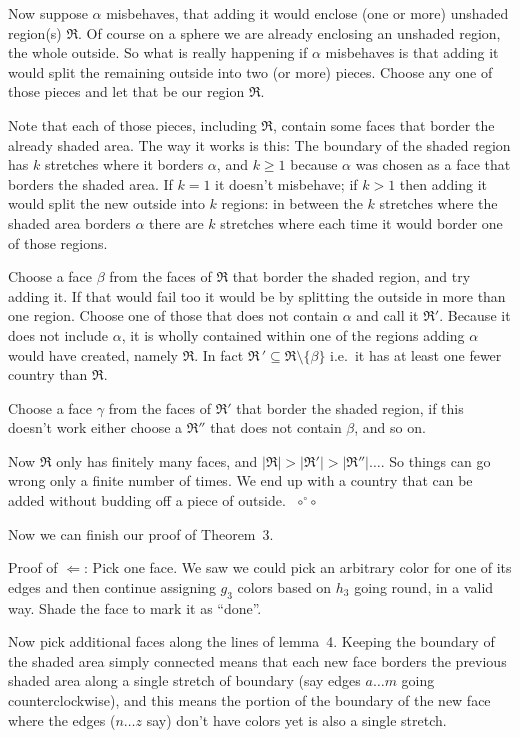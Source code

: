 \documentclass[12pt]{article}
\let\ge\geqslant
\let\S\scriptstyle
\let\os\Longleftarrow
\def\qed{ ${\S\circ}\!{}^\circ\!{\S\circ}$}
\let\frakR\Re
\begin{document}
Now suppose $\alpha$ misbehaves, that adding it would enclose (one or more)
unshaded region(s) $\frakR$. Of course on a sphere we are already
enclosing an unshaded region, the whole outside. So what is really happening
if $\alpha$ misbehaves is that adding it would split the remaining outside
into two (or more) pieces. Choose any one of those pieces and let that be
our region $\frakR$.

Note that each of those pieces, including $\frakR$, contain some faces that
border the already shaded area. The way it works is this: The boundary of the
shaded region has $k$ stretches where it borders $\alpha$, and $k\ge1$ because
$\alpha$ was chosen as a face that borders the shaded area. If $k=1$ it doesn't
misbehave; if $k\gt1$ then adding it would split the new outside into $k$
regions: in between the $k$ stretches where the shaded area borders $\alpha$
there are $k$ stretches where each time it would border one of those regions.

Choose a face $\beta$ from the faces of $\frakR$ that border the shaded
region, and try adding it. If that would fail too it would be by splitting
the outside in more than one region. Choose one of those that does not contain
$\alpha$ and call it $\frakR'$. Because it does not include $\alpha$, it is
wholly contained within one of the regions adding $\alpha$ would have created,
namely $\frakR$. In fact $\frakR\,'\subseteq\frakR\setminus\{\beta\}$ i.e.\
it has at least one fewer country than $\frakR$.

Choose a face $\gamma$ from the faces of $\frakR'$ that border the shaded
region, if this doesn't work either choose a $\frakR''$ that does not contain
$\beta$, and so on.

Now $\frakR$ only has finitely many faces, and $|\frakR|\gt|\frakR'|\gt|\frakR''|\dots$.
So things can go wrong only a finite number of times. We end up with a country
that can be added without budding off a piece of outside.~\qed

\vfill\pagebreak
Now we can finish our proof of Theorem~3.

Proof of $\os$: Pick one face. We saw we could pick an arbitrary color for one
of its edges and then continue assigning $g_3$ colors based on $h_3$ going
round, in a valid way. Shade the face to mark it as ``done''.

Now pick additional faces along the lines of lemma~4. Keeping the boundary of
the shaded area simply connected means that each new face borders the previous
shaded area along a single stretch of boundary (say edges $a\dots m$ going
counterclockwise), and this means the portion of the boundary of the new face
where the edges ($n\dots z$ say) don't have colors yet is also a single stretch.
\end{document}
